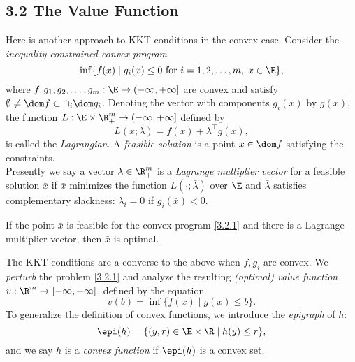 \documentclass[../borwein-lewis_notes.tex]{subfiles}
\begin{document}
\maketitle
\subsection{3.2 The Value Function}
Here is another approach to KKT conditions in the convex case.
Consider the \textit{inequality constrained convex program}
\begin{equation}
\inf\{f(x)\mid g_i(x)\leq 0 \text{ for } i=1,2,\ldots, m,\; x\in \E\},
\label{3.2.1}
\end{equation}
where $f,g_1,g_2,\ldots, g_m:\E\to (-\infty, +\infty]$ are convex 
and satisfy $\emptyset\neq \dom f\subset\cap_i\dom g_i$. Denoting 
the vector with components $g_i(x)$ by $g(x)$, the function $L:\E
\times \R_+^m\to(-\infty, +\infty]$ defined by 
\begin{equation}
L(x;\lambda) = f(x)+\lambda^\top g(x),
\label{3.2.2}
\end{equation}
is called the \textit{Lagrangian}. A \textit{feasible solution} is a 
point $x\in\dom f$ satisfying the constraints. \\
Presently we say a vector $\bar\lambda\in\R_+^m$ is a \textit{Lagrange 
multiplier vector} for a feasible solution $\bar x$ if $\bar x$ 
minimizes the function $L(\cdot;\bar\lambda)$ over $\E$ and 
$\bar \lambda$ satisfies complementary slackness: $\bar\lambda_i=0$ 
if $g_i(\bar x) < 0$.
\begin{proposition}
\label{3.2.3}
If the point $\bar x$ is feasible for the convex program \eqref{3.2.1}
and there is a Lagrange multiplier vector, then $\bar x$ is optimal.
\end{proposition}
The KKT conditions are a converse to the above when $f,g_i$ are convex.
 We \textit{perturb} the problem \eqref{3.2.1} and 
analyze the resulting \textit{(optimal) value function} $v:\R^m\to[
-\infty, +\infty]$, defined by the equation 
\begin{equation}
v(b) = \inf\{f(x)\mid g(x)\leq b\}.
\label{3.2.4}
\end{equation}
To generalize the definition of convex functions, we introduce the 
\textit{epigraph} of $h$:
\begin{equation}
\epi(h) = \{(y,r)\in\E\times\R\mid h(y)\leq r\},
\label{3.2.5}
\end{equation}
and we say $h$ is a \textit{convex function} if $\epi(h)$ is a convex set.
\end{document}
